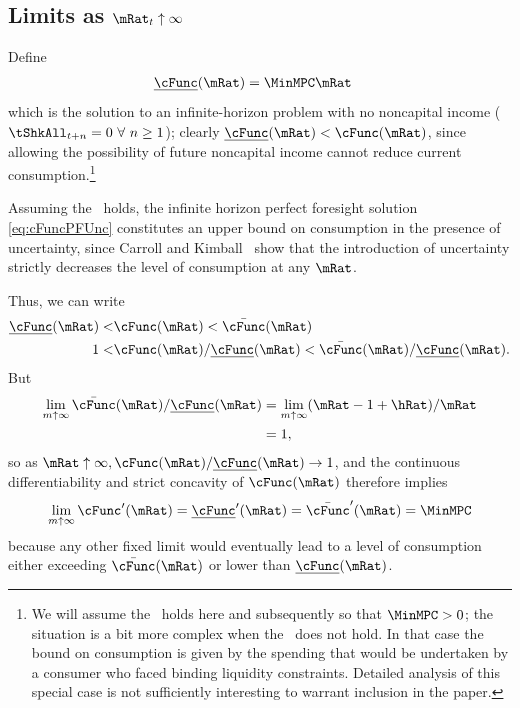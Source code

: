 \documentclass[BufferStockTheory]{subfiles}
\begin{document}
\hypertarget{LimitsAsmtToInfty}{}
\subsection{Limits as $\mRat_t \uparrow \infty$}

\label{subsec:LimitsAsmtToInfty}

Define
\begin{align}
  \ushort{\cFunc}(\mRat)  & = \MinMPC \mRat \nonumber
\end{align}
which is the solution to an infinite-horizon problem with no noncapital
income
($\tShkAll_{t+n} = 0~\forall~n\geq1$); 
clearly $\ushort{\cFunc}(\mRat)
< \cFunc(\mRat)$, since allowing the possibility of future noncapital
income cannot reduce current consumption.\footnote{We will assume the
  \RIC~holds here and subsequently so that $\MinMPC > 0$; the situation
  is a bit more complex when the \RIC~does not hold.   In that case the bound on consumption is given by the spending
  that would be undertaken by a consumer who faced binding liquidity
  constraints.  Detailed analysis of this special case is not
  sufficiently interesting to warrant inclusion in the paper.}

Assuming the \FHWC~holds, the infinite horizon perfect
foresight solution \eqref{eq:cFuncPFUnc} constitutes an upper
bound on consumption in the presence of uncertainty, since Carroll and
Kimball~\citeyearpar{ckConcavity} show that the introduction of
uncertainty strictly decreases the level of consumption at any $\mRat$.

Thus, we can write
\begin{align}  
  \ushort{\cFunc}(\mRat) < & \cFunc(\mRat)  < \bar{\cFunc}(\mRat) \label{eq:lowerltupper} \\
  1 < & \cFunc(\mRat)/\ushort{\cFunc}(\mRat)  < \bar{\cFunc}(\mRat)/\ushort{\cFunc}(\mRat). \nonumber
\end{align}
But
\begin{align}  \label{eq:limitlowerupper}
  \lim_{m \uparrow \infty} \bar{\cFunc}(\mRat)/\ushort{\cFunc}(\mRat) 
  & = \lim_{m \uparrow \infty} (\mRat -1+ \hRat)/\mRat \nonumber \\
  & = 1, \nonumber
\end{align}
so as $\mRat \uparrow \infty, \cFunc(\mRat)/\ushort{\cFunc}(\mRat)
\rightarrow 1$, and the continuous differentiability and strict
concavity of $\cFunc(\mRat)$ therefore implies
\begin{equation}  \label{eq:limxtoinftycp}
  \lim_{m \uparrow \infty} \cFunc^{\prime}(\mRat) =
  \ushort{\cFunc}^{\prime}(\mRat) = \bar{\cFunc}^{\prime}(\mRat) = \MinMPC \notag
\end{equation}
because any other fixed limit would eventually lead to a level of
consumption either exceeding $\bar{\cFunc}(\mRat)$ or lower than
$\ushort{\cFunc}(\mRat)$.
\end{document}
